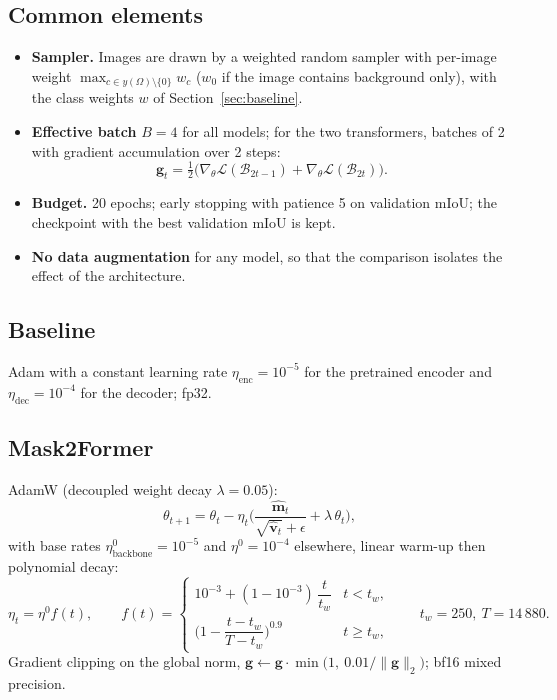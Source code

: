 \documentclass[11pt,a4paper]{article}
\newcommand{\1}{\mathbb{1}}
\begin{document}
\subsection{Common elements}

\begin{itemize}[leftmargin=1.5em]
\item \textbf{Sampler.} Images are drawn by a weighted random sampler with
  per-image weight $\max_{c\in y(\Omega)\setminus\{0\}} w_c$ ($w_0$ if the
  image contains background only), with the class weights $w$ of
  Section~\ref{sec:baseline}.
\item \textbf{Effective batch} $B=4$ for all models; for the two transformers,
  batches of 2 with gradient accumulation over 2 steps:
  \[
  \bm g_t = \tfrac12\big(\nabla_\theta\mathcal{L}(\mathcal{B}_{2t-1})
          + \nabla_\theta\mathcal{L}(\mathcal{B}_{2t})\big).
  \]
\item \textbf{Budget.} 20 epochs; early stopping with patience 5 on
  validation mIoU; the checkpoint with the best validation mIoU is kept.
\item \textbf{No data augmentation} for any model, so that the comparison
  isolates the effect of the architecture.
\end{itemize}

\subsection{Baseline}

Adam \cite{kingma2015} with a constant learning rate
$\eta_{\text{enc}} = 10^{-5}$ for the pretrained encoder and
$\eta_{\text{dec}} = 10^{-4}$ for the decoder; fp32.

\subsection{Mask2Former}

AdamW \cite{loshchilov2019} (decoupled weight decay $\lambda=0.05$):
\[
\theta_{t+1} = \theta_t - \eta_t\Big(\frac{\hat{\bm m}_t}{\sqrt{\hat{\bm v}_t}+\epsilon} + \lambda\,\theta_t\Big),
\]
with base rates $\eta^0_{\text{backbone}} = 10^{-5}$ and $\eta^0 = 10^{-4}$
elsewhere, linear warm-up then polynomial decay:
\[
\eta_t = \eta^0 f(t),\qquad
f(t) =
\begin{cases}
10^{-3} + (1-10^{-3})\,\dfrac{t}{t_w} & t < t_w,\\[8pt]
\Big(1-\dfrac{t-t_w}{T-t_w}\Big)^{0.9} & t\ge t_w,
\end{cases}
\qquad t_w = 250,\ T = 14\,880 .
\]
Gradient clipping on the global norm,
$\bm g \leftarrow \bm g\cdot\min\!\big(1,\ 0.01/\lVert\bm g\rVert_2\big)$;
bf16 mixed precision.
\end{document}
